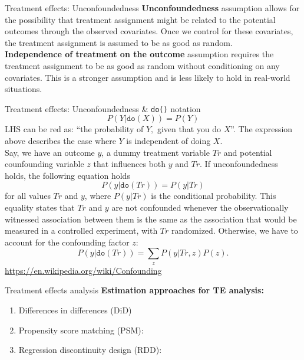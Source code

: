 \documentclass{beamer}
\begin{document}
\begin{frame}{Treatment effects: Unconfoundedness}
\textbf{Unconfoundedness} assumption allows for the possibility that treatment assignment might be related to the potential outcomes through the observed covariates. Once we control for these covariates, the treatment assignment is assumed to be as good as random. \\
\bigskip
\textbf{Independence of treatment on the outcome} assumption requires the treatment assignment to be as good as random without conditioning on any covariates. This is a stronger assumption and is less likely to hold in real-world situations.
\end{frame}
\begin{frame}{Treatment effects: Unconfoundedness \& \texttt{do()} notation}
\small 
$$P(Y|\texttt{do}(X)) = P(Y)$$ 
LHS can be red as: ``the probability of $Y,$ given that you do  $X$''. The expression above describes the case where $Y$ is independent of doing $X$.\\
\bigskip
Say, we have an outcome $y$, a dummy treatment variable $\textit{Tr}$ and potential counfounding variable $z$ that influences both $y$ and $\textit{Tr}$. If unconfoundedness holds, the following equation holds
$$P(y | \texttt{do}(\textit{Tr})) = P(y|\textit{Tr})$$
for all values $\textit{Tr}$ and $y$, where $P(y|\textit{Tr})$ is the conditional probability. This equality states that $\textit{Tr}$ and $y$ are not confounded whenever the observationally witnessed association between them is the same as the association that would be measured in a controlled experiment, with $\textit{Tr}$ randomized. Otherwise, we have to account for the confounding factor $z$:
$$P(y | \texttt{do}(\textit{Tr})) = \sum_z P(y|\textit{Tr},z)P(z). $$
\centering
\url{https://en.wikipedia.org/wiki/Confounding}
\end{frame}
\begin{frame}{Treatment effects analysis}
\textbf{Estimation approaches for TE analysis:}\\
\bigskip
\begin{enumerate}
    \item Differences in differences (DiD)
    \bigskip
    \item Propensity score matching (PSM):
    \bigskip
    \item Regression discontinuity design (RDD):
\end{enumerate}
\end{frame}
\end{document}
